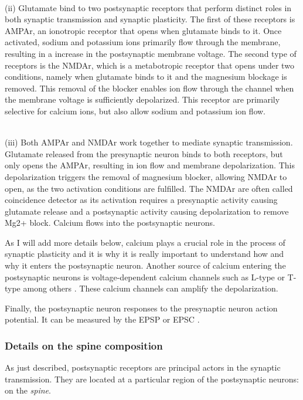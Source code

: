 ~\\
(ii) Glutamate bind to two postsynaptic receptors that perform distinct roles in both synaptic  transmission and synaptic plasticity.  The first of these receptors is \acrshort{AMPAr}, an ionotropic receptor that opens when glutamate binds to it. Once activated, sodium and potassium ions primarily flow through the membrane, resulting in a increase in the postsynaptic membrane voltage. The second type of receptors is the \acrshort{NMDAr}, which is a metabotropic receptor that opens under two conditions, namely when glutamate binds to it and the magnesium blockage is removed. This removal of the blocker enables ion flow through the channel when the membrane voltage is sufficiently depolarized. This receptor are primarily selective for calcium ions, but also allow sodium and potassium ion flow. 

~\\
(iii) Both \acrshort{AMPAr} and \acrshort{NMDAr} work together to mediate synaptic transmission. Glutamate released from the presynaptic neuron binds to both receptors, but only opens the \acrshort{AMPAr}, resulting in ion flow and membrane depolarization. This depolarization triggers the removal of magnesium blocker, allowing \acrshort{NMDAr} to open, as the two activation conditions are fulfilled. The \acrshort{NMDAr} are often called coincidence detector as its activation requires a presynaptic activity causing glutamate release and a postsynaptic activity causing depolarization to remove Mg2+ block. Calcium flows into the postsynaptic neurons.



As I will add more details below, calcium plays a crucial role in the process of synaptic plasticity and it is why it is really important to understand how and why it enters the postsynaptic neuron.  Another source of calcium entering the postsynaptic neurons is voltage-dependent calcium channels such as L-type or T-type among others \citep{lamprecht_structural_2004}. These calcium channels can amplify the depolarization. 

Finally, the postsynaptic neuron responses to the presynaptic neuron action potential. It can be measured by the \acrfull{EPSP} or \acrfull{EPSC} \citep{citri_synaptic_2008}.


\subsubsection{Details on the spine composition}
As just described, postsynaptic receptors are principal actors in the synaptic transmission. They are located at a particular region of the postsynaptic neurons: on the \textit{spine}. 

